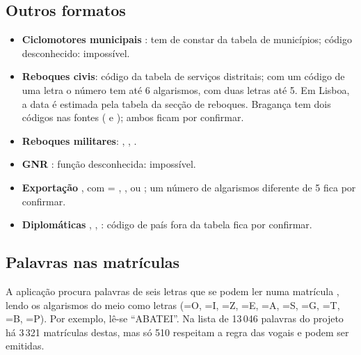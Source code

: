 \subsection{Outros formatos}
\begin{itemize}
  \item \textbf{Ciclomotores municipais} :  tem de
        constar da tabela de municípios; código desconhecido: impossível.
  \item \textbf{Reboques civis}: código da tabela de serviços distritais; com um
        código de uma letra o número tem até 6 algarismos, com duas letras até 5.
        Em Lisboa, a data é estimada pela tabela da secção de reboques.
        Bragança tem dois códigos nas fontes ( e ); ambos
        ficam por confirmar.
  \item \textbf{Reboques militares}: , , .
  \item \textbf{GNR} : função desconhecida: impossível.
  \item \textbf{Exportação} , com  = , ,
         ou ; um número de algarismos diferente de 5 fica por
        confirmar.
  \item \textbf{Diplomáticas} , ,
        : código de país fora da tabela fica por confirmar.
\end{itemize}

\subsection{Palavras nas matrículas}

A aplicação procura palavras de seis letras que se podem ler numa matrícula
, lendo os algarismos do meio como letras
(=O, =I, =Z, =E, =A, =S,
=G, =T, =B, =P). Por exemplo, 
lê-se “ABATEI”. Na lista de 13\,046 palavras do projeto há 3\,321 matrículas
destas, mas só 510 respeitam a regra das vogais e podem ser emitidas.
